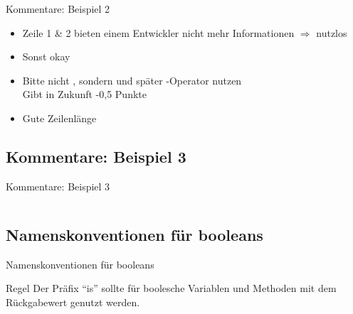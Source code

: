 \documentclass[usepdftitle=false,hyperref={pdfpagelabels=false}]{beamer}
\begin{document}
\begin{frame}{Kommentare: Beispiel 2}
    \begin{itemize}
        \item Zeile 1 \& 2 bieten einem Entwickler nicht mehr Informationen
              $\Rightarrow$ nutzlos
        \item Sonst okay
        \item Bitte nicht , sondern 
              und später -Operator nutzen\\
              Gibt in Zukunft -0,5 Punkte
        \item Gute Zeilenlänge \smiley
    \end{itemize}
\end{frame}

\subsection{Kommentare: Beispiel 3}
\begin{frame}{Kommentare: Beispiel 3}
    \inputminted[linenos=true, numbersep=5pt, tabsize=4, fontsize=\tiny]{java}{Kommentare-3.java}
\end{frame}

\subsection{Namenskonventionen für booleans}
\begin{frame}{Namenskonventionen für booleans}
    \begin{block}{Regel}
        Der Präfix "`is"' sollte für boolesche Variablen und Methoden
        mit dem Rückgabewert  genutzt werden.
    \end{block}



\end{frame}
\end{document}
